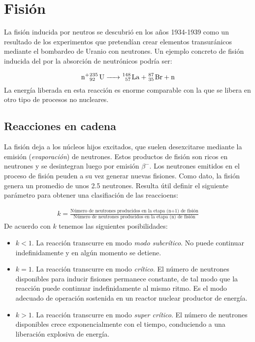 \section{Fisión}

La fisión inducida por neutros se descubrió en los años 1934-1939 como un resultado de los experimentos que pretendían crear elementos transuránicos mediante el bombardeo de Uranio con neutrones. Un ejemplo concreto de fisión inducida del  por la absorción de neutrónicos podría ser:

\begin{equation}
\ce{n+^235_92 U -> ^148_57 La + ^87_35 Br + n}
\end{equation}
La energía liberada en esta reacción es enorme comparable con la que se libera en otro tipo de procesos no nucleares. 


\subsection{Reacciones en cadena}

La fisión deja a los núcleos hijos excitados, que suelen desexcitarse mediante la emisión (\textit{evaporación}) de neutrones. Estos productos de fisión son ricos en neutrones y se desintegran luego por emisión $\beta^-$. Los neutrones emitidos en el proceso de fisión peuden a su vez generar nuevas fisiones. Como dato, la fisión  genera un promedio de unos 2.5 neutrones. Resulta útil definir el siguiente parámetro para obtener una clasifiación de las reaccioens:

\begin{eqnarray}    
    k = \frac{\text{Número de neutrones producidos en la etapa (n+1) de fisión}}{\text{Número de neutrones producidos en la etapa (n) de fisión}}
\end{eqnarray}
De acuerdo con $k$ tenemos las siguientes posibilidades:

\begin{itemize}
    \item $k<1$. La reacción transcurre en modo \textit{modo subcrítico}. No puede continuar indefinidamente y en algún momento se detiene.
    \item $k=1$. La reacción transcurre en modo \textit{crítico}. El número de neutrones disponibles para inducir fisiones permanece constante, de tal modo que la reacción puede continuar indefinidamente al mismo ritmo. Es el modo adecuado de operación sostenida en un reactor nuclear productor de energía.
    \item $k>1$. La reacción transcurre en modo \textit{super crítico}. El número de neutrones disponibles crece exponencialmente con el tiempo, conduciendo a una liberación explosiva de energía.
\end{itemize}

